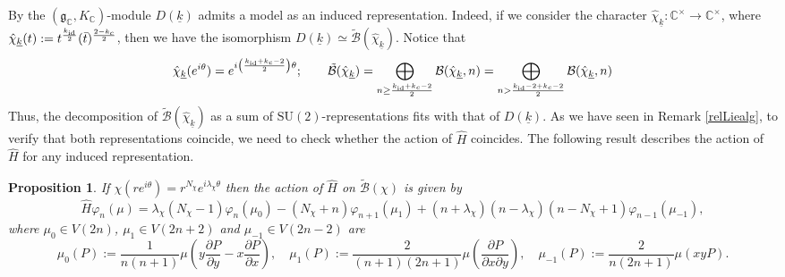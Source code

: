 \documentclass{amsart}
\newtheorem{proposition}[theorem]{Proposition}
\theoremstyle{definition}
\theoremstyle{remark}
\numberwithin{equation}{section}
\newcommand{\SU}{{\mathrm{SU}}}
\newcommand{\C}{{\mathbb C}}
\newcommand{\cB}{{\mathcal B}}
\newcommand{\mfg}{{\mathfrak g}}
\begin{document}
By \cite[Theorem 6.2]{JL} the $(\mfg_\C,K_\C)$-module $D(\underline k)$ admits a model as an induced representation. Indeed, if we consider the character
$\hat\chi_{\underline k}:\C^\times\rightarrow\C^\times$, where $\hat\chi_{\underline k}(t):=t^{\frac{k_{\rm id}}{2}}(\bar t)^{\frac{2-k_{c}}{2}}$, then we have the isomorphism $D(\underline k)\simeq \tilde \cB(\hat\chi_{\underline k})$. Notice that 
\[
\hat\chi_{\underline k}(e^{i\theta})=e^{i\left(\frac{k_{\rm id}+k_{c}-2}{2}\right)\theta};\qquad \tilde \cB(\hat\chi_{\underline{k}})=\bigoplus_{n\geq \frac{k_{\rm id}+k_{c}-2}{2}}\cB(\hat\chi_{\underline{k}},n)=\bigoplus_{n> \frac{k_{\rm id}-2+k_{c}-2}{2}}\cB(\hat\chi_{\underline{k}},n)
\]
Thus, the decomposition of $\tilde \cB(\hat\chi_{\underline{k}})$ as a sum of $\SU(2)$-representations fits with that of $D(\underline k)$. As we have seen in Remark \ref{relLiealg}, to verify that both representations coincide, we need to check whether the action of $\hat H$ coincides. The following result describes the action of $\hat H$ for any induced representation.
\begin{proposition}\label{acthatHforvarphi}
    If $\chi(re^{i\theta})=r^{N_{\chi}}e^{i\lambda_\chi \theta}$ then the action of $\hat H$ on $\tilde \cB(\chi)$ is given by
\[
\hat H \varphi_n(\mu)=\lambda_{\chi}(N_{\chi}-1)\varphi_n(\mu_0)-(N_{\chi}+n)\varphi_{n+1}(\mu_1)+(n+\lambda_{\chi})(n-\lambda_{\chi})(n-N_{\chi}+1)\varphi_{n-1}(\mu_{-1}),
\]
where $\mu_0\in V(2n)$, $\mu_1\in V(2n+2)$ and $\mu_{-1}\in V(2n-2)$ are
\[
\mu_0(P):=\frac{1}{n(n+1)}\mu\left(
y\frac{\partial P}{\partial y}-x\frac{\partial P}{\partial x}\right),\quad\mu_1(P):=\frac{2}{(n+1)(2n+1)}\mu\left(\frac{\partial P}{\partial x\partial y}\right),\quad \mu_{-1}(P):=\frac{2}{n(2n+1)}\mu\left(xyP\right).
\] 
\end{proposition}
\end{document}
